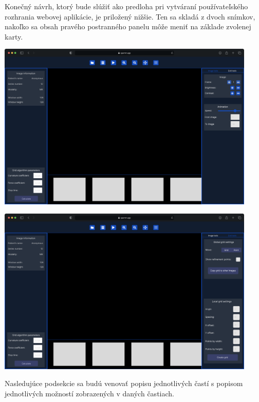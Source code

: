 Konečný návrh, ktorý bude slúžiť ako predloha pri vytváraní používateľského rozhrania webovej aplikácie, je priložený nižšie. Ten sa skladá z dvoch snímkov, nakoľko sa obsah pravého postranného panelu môže meniť na základe zvolenej karty. \clearpage

\begin {center}
\centering
\includegraphics[height=8cm]{media/wireframes/1.png}
\captionsetup{justification=centering}
\end {center}

\begin {center}
\centering
\includegraphics[height=8cm]{media/wireframes/2.png}
\captionsetup{justification=centering}
\end {center}

Nasledujúce podsekcie sa budú venovať popisu jednotlivých častí s popisom jednotlivých možností zobrazených v daných častiach.

